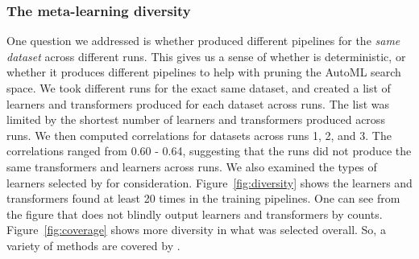 \subsubsection{The {\sysname} meta-learning diversity} 
One question we addressed is whether {\sysname} produced different pipelines for the \textit{same dataset} across different runs. This gives us a sense of whether {\sysname} is deterministic, or whether it produces different pipelines to help with pruning the AutoML search space.  We took different runs for the exact same dataset, and created a list of learners and transformers produced for each dataset across runs.  The list was limited by the shortest number of learners and transformers produced across runs.  We then computed correlations for datasets across runs 1, 2, and 3.  The correlations ranged from 0.60 - 0.64, suggesting that the runs did not produce the same transformers and learners across runs.
We also examined the types of learners selected by {\sysname} for consideration.  
Figure~\ref{fig:diversity} shows the learners and transformers found at least 20 times in the training pipelines.  One can see from the figure that {\sysname} does not blindly output learners and transformers by counts. 
Figure~\ref{fig:coverage} shows more diversity in what was selected overall. So, a variety of methods are covered by {\sysname}. 




% 